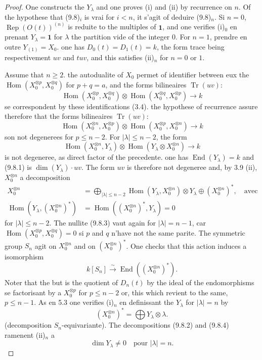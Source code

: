 \documentclass[11pt,a4paper]{article}
\theoremstyle{plain}
\theoremstyle{definition}
\DeclareMathOperator{\Hom}{Hom}
\DeclareMathOperator{\End}{End}
\DeclareMathOperator{\Tr}{Tr}
\DeclareMathOperator{\Rep}{Rep}
\newcommand{\isom}{\xrightarrow{\sim}}
\begin{document}
\begin{proof}
One constructs the $Y_\lambda$ and one proves (i) and (ii) by recurrence on $n$. Of the hypothese that (9.8)$_i$ is vrai for $i < n$, it s'agit of deduire (9.8)$_n$. Si $n = 0$, $\Rep(O(t))^{(n)}$ is reduite to the multiples of $\mathbf{1}$, and one verifies (i)$_0$ en prenant $Y_\lambda = \mathbf{1}$ for $\lambda$ the partition vide of the integer $0$. For $n = 1$, prendre en outre $Y_{(1)} = X_0$. one has $D_0(t) = D_1(t) = k$, the form trace being respectivement $uv$ and $tuv$, and this satisfies (ii)$_n$ for $n = 0$ or $1$.

Assume that $n \geq 2$. the autodualite of $X_0$ permet of identifier between eux the $\Hom(X_0^{\otimes p}, X_0^{\otimes q})$ for $p + q = a$, and the forms bilineaires $\Tr(uv)$:
\[
\Hom(X_0^{\otimes p}, X_0^{\otimes q}) \otimes \Hom(X_0^{\otimes q}, X_0^{\otimes p}) \to k
\]
se correspondent by these identifications (3.4). the hypothese of recurrence assure therefore that the forms bilineaires $\Tr(uv)$:
\[
\Hom(X_0^{\otimes n}, X_0^{\otimes p}) \otimes \Hom(X_0^{\otimes p}, X_0^{\otimes n}) \to k
\]
son not degenerees for $p \leq n - 2$. For $|\lambda| \leq n - 2$, the form
\begin{equation}
\Hom(X_0^{\otimes n}, Y_\lambda) \otimes \Hom(Y_\lambda \otimes X_0^{\otimes n}) \to k \tag{9.8.1}
\end{equation}
is not degeneree, as direct factor of the precedente. one has $\End(Y_\lambda) = k$ and (9.8.1) is $\dim(Y_\lambda) \cdot uv$. The form $uv$ is therefore not degeneree and, by 3.9 (ii), $X_0^{\otimes n}$ a decomposition
\begin{align}
X_0^{\otimes n} &= \bigoplus_{|\lambda| \leq n-2} \Hom(Y_\lambda, X_0^{\otimes n}) \otimes Y_\lambda \oplus (X_0^{\otimes n})^*, \quad \text{avec} \tag{9.8.2} \\
\Hom(Y_\lambda, (X_0^{\otimes n})^*) &= \Hom((X_0^{\otimes n})^*, Y_\lambda) = 0 \tag{9.8.3}
\end{align}
for $|\lambda| \leq n - 2$. The nullite (9.8.3) vaut again for $|\lambda| = n - 1$, car $\Hom(X_0^{\otimes p}, X_0^{\otimes q}) = 0$ si $p$ and $q$ n'have not the same parite. The symmetric group $S_n$ agit on $X_0^{\otimes n}$ and on $(X_0^{\otimes n})^*$. One checks that this action induces a isomorphism
\[
k[S_n] \isom \End((X_0^{\otimes n})^*).
\]
Noter that the but is the quotient of $D_n(t)$ by the ideal of the endomorphisms se factorisant by a $X_0^{\otimes p}$ for $p \leq n - 2$ or, this which revient to the same, $p \leq n - 1$. As en 5.3 one verifies (i)$_n$ en definissant the $Y_\lambda$ for $|\lambda| = n$ by
\begin{equation}
(X_0^{\otimes n})^* = \bigoplus Y_\lambda \otimes \lambda. \tag{9.8.4}
\end{equation}
(decomposition $S_n$-equivariante). The decompositions (9.8.2) and (9.8.4) ramenent (ii)$_n$ a
\begin{equation}
\dim Y_\lambda \neq 0 \quad \text{pour } |\lambda| = n. \tag{9.8.5}
\end{equation}


\end{proof}
\end{document}
